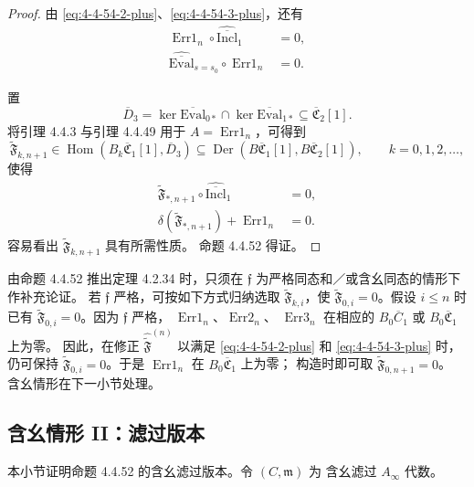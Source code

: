 \begin{proof}
由 \eqref{eq:4-4-54-2-plus}、\eqref{eq:4-4-54-3-plus}，还有
\begin{align}
 \operatorname{Err1}_n
 \circ\widehat{\overline{\mathrm{Incl}}}_1&=0,
 \tag{4.4.59.1}\label{eq:4-4-59-1}\\
 \widehat{\overline{\mathrm{Eval}}}_{s=s_0}
 \circ\operatorname{Err1}_n&=0.
 \tag{4.4.59.2}\label{eq:4-4-59-2}
\end{align}

置
\[
 \overline D_3
 =\ker\overline{\mathrm{Eval}}_{0*}
 \cap\ker\overline{\mathrm{Eval}}_{1*}
 \subseteq\overline{\mathfrak C}_2[1].
\]
将引理 4.4.3 与引理 4.4.49 用于
$A=\operatorname{Err1}_n$，可得到
\[
 \widetilde{\mathfrak F}_{k,n+1}
 \in\operatorname{Hom}
 (B_k\overline{\mathfrak C}_1[1],\overline D_3)
 \subseteq
 \operatorname{Der}(B\overline{\mathfrak C}_1[1],
 B\overline{\mathfrak C}_2[1]),
 \qquad k=0,1,2,\ldots,
\]
使得
\begin{align}
 \widetilde{\mathfrak F}_{*,n+1}
 \circ\widehat{\overline{\mathrm{Incl}}}_1&=0,
 \tag{4.4.60.1}\label{eq:4-4-60-1}\\
 \delta(\widetilde{\mathfrak F}_{*,n+1})
 +\operatorname{Err1}_n&=0.
 \tag{4.4.60.2}\label{eq:4-4-60-2}
\end{align}
容易看出 $\widetilde{\mathfrak F}_{k,n+1}$ 具有所需性质。
命题 4.4.52 得证。
\end{proof}

由命题 4.4.52 推出定理 4.2.34 时，只须在
$\mathfrak f$ 为严格同态和／或含幺同态的情形下作补充论证。
若 $\mathfrak f$ 严格，可按如下方式归纳选取
$\widetilde{\mathfrak F}_{k,i}$，使
$\widetilde{\mathfrak F}_{0,i}=0$。假设 $i\leq n$ 时已有
$\widetilde{\mathfrak F}_{0,i}=0$。因为 $\mathfrak f$ 严格，
$\operatorname{Err1}_n$、$\operatorname{Err2}_n$、
$\operatorname{Err3}_n$ 在相应的
$B_0\overline C_1$ 或 $B_0\overline{\mathfrak C}_1$ 上为零。
因此，在修正 $\widehat{\widetilde{\mathfrak F}}^{(n)}$ 以满足
\eqref{eq:4-4-54-2-plus} 和 \eqref{eq:4-4-54-3-plus} 时，仍可保持
$\widetilde{\mathfrak F}_{0,i}=0$。于是
$\operatorname{Err1}_n$ 在 $B_0\overline{\mathfrak C}_1$ 上为零；
构造时即可取 $\widetilde{\mathfrak F}_{0,n+1}=0$。
含幺情形在下一小节处理。

\subsection{含幺情形 II：滤过版本}
\label{subsec:4-4-7}

本小节证明命题 4.4.52 的含幺滤过版本。令 $(C,\mathfrak m)$ 为
含幺滤过 $A_\infty$ 代数。

